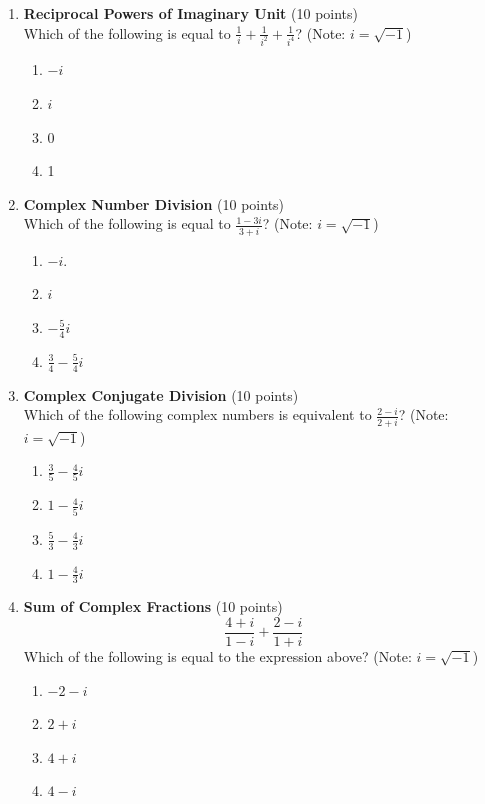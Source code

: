 \begin{enumerate}
  \item \textbf{Reciprocal Powers of Imaginary Unit} (10 points)\\
  Which of the following is equal to $\frac{1}{i}+\frac{1}{i^2}+\frac{1}{i^4}$? (Note: $i=\sqrt{-1}$)
  \begin{enumerate}[label=(\Alph*)]
    \item $-i$
    \item $i$
    \item 0
    \item 1
  \end{enumerate}
  \begin{subanswer}
  \end{subanswer}

  \item \textbf{Complex Number Division} (10 points)\\
  Which of the following is equal to $\frac{1-3 i}{3+i}$? (Note: $i=\sqrt{-1}$)
  \begin{enumerate}[label=(\Alph*)]
    \item $-i$.
    \item $i$
    \item $-\frac{5}{4} i$
    \item $\frac{3}{4}-\frac{5}{4} i$
  \end{enumerate}
  \begin{subanswer}
  \end{subanswer}

  \item \textbf{Complex Conjugate Division} (10 points)\\
  Which of the following complex numbers is equivalent to $\frac{2-i}{2+i}$? (Note: $i=\sqrt{-1}$)
  \begin{enumerate}[label=(\Alph*)]
    \item $\frac{3}{5}-\frac{4}{5} i$
    \item $1-\frac{4}{5} i$
    \item $\frac{5}{3}-\frac{4}{3} i$
    \item $1-\frac{4}{3} i$
  \end{enumerate}
  \begin{subanswer}
  \end{subanswer}

  \item \textbf{Sum of Complex Fractions} (10 points)\\
  \[
  \frac{4+i}{1-i}+\frac{2-i}{1+i}
  \]
  Which of the following is equal to the expression above? (Note: $i=\sqrt{-1}$)
  \begin{enumerate}[label=(\Alph*)]
    \item $-2-i$
    \item $2+i$
    \item $4+i$
    \item $4-i$
  \end{enumerate}
  \begin{subanswer}
  \end{subanswer}
\end{enumerate}